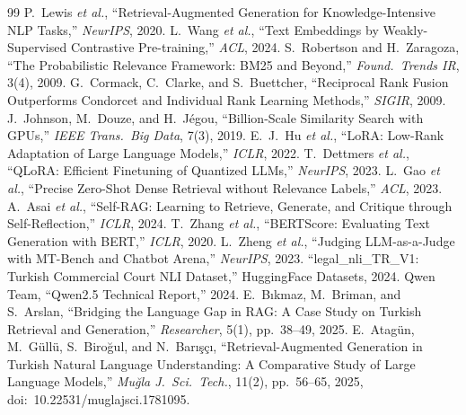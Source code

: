 \documentclass[conference]{IEEEtran}
\begin{document}
\begin{thebibliography}{99}
\footnotesize
{} P.~Lewis \emph{et al.}, ``Retrieval-Augmented Generation
for Knowledge-Intensive NLP Tasks,'' \emph{NeurIPS}, 2020.
 L.~Wang \emph{et al.}, ``Text Embeddings by
Weakly-Supervised Contrastive Pre-training,'' \emph{ACL}, 2024.
 S.~Robertson and H.~Zaragoza, ``The Probabilistic
Relevance Framework: BM25 and Beyond,'' \emph{Found.\ Trends IR}, 3(4), 2009.
 G.~Cormack, C.~Clarke, and S.~Buettcher, ``Reciprocal
Rank Fusion Outperforms Condorcet and Individual Rank Learning Methods,''
\emph{SIGIR}, 2009.
 J.~Johnson, M.~Douze, and H.~J\'egou, ``Billion-Scale
Similarity Search with GPUs,'' \emph{IEEE Trans.\ Big Data}, 7(3), 2019.
 E.~J.~Hu \emph{et al.}, ``LoRA: Low-Rank Adaptation of Large
Language Models,'' \emph{ICLR}, 2022.
 T.~Dettmers \emph{et al.}, ``QLoRA: Efficient
Finetuning of Quantized LLMs,'' \emph{NeurIPS}, 2023.
 L.~Gao \emph{et al.}, ``Precise Zero-Shot Dense Retrieval
without Relevance Labels,'' \emph{ACL}, 2023.
 A.~Asai \emph{et al.}, ``Self-RAG: Learning to
Retrieve, Generate, and Critique through Self-Reflection,'' \emph{ICLR}, 2024.
 T.~Zhang \emph{et al.}, ``BERTScore: Evaluating Text
Generation with BERT,'' \emph{ICLR}, 2020.
 L.~Zheng \emph{et al.}, ``Judging LLM-as-a-Judge with
MT-Bench and Chatbot Arena,'' \emph{NeurIPS}, 2023.
 ``legal\_nli\_TR\_V1: Turkish Commercial Court NLI
Dataset,'' HuggingFace Datasets, 2024.
 Qwen Team, ``Qwen2.5 Technical Report,'' 2024.
 E.~B\i kmaz, M.~Briman, and S.~Arslan, ``Bridging
the Language Gap in RAG: A Case Study on Turkish Retrieval and Generation,''
\emph{Researcher}, 5(1), pp.~38--49, 2025.
 E.~Atag\"un, M.~G\"ull\"u, S.~Biro\u{g}ul, and
N.~Bar\i\c{s}\c{c}\i, ``Retrieval-Augmented Generation in Turkish Natural
Language Understanding: A Comparative Study of Large Language Models,''
\emph{Mu\u{g}la J.\ Sci.\ Tech.}, 11(2), pp.~56--65, 2025,
doi:~10.22531/muglajsci.1781095.
\end{thebibliography}
\end{document}

